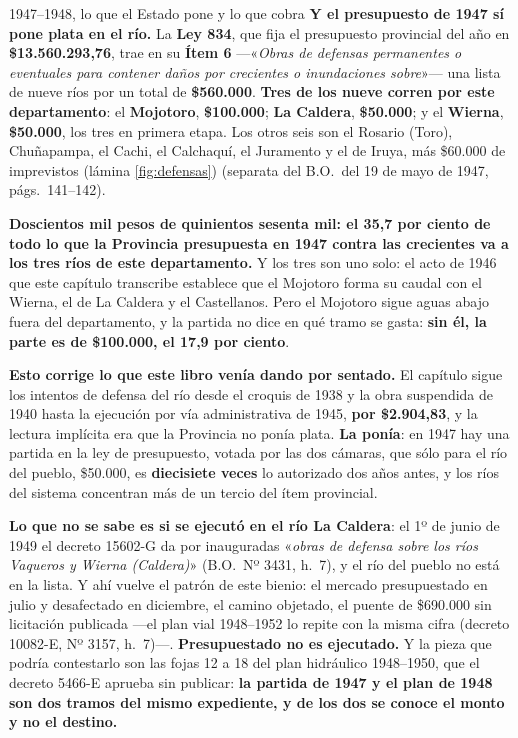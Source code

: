 \begin{ficha}{1947--1948, lo que el Estado pone y lo que cobra}
\textbf{Y el presupuesto de 1947 sí pone plata en el río.} La \textbf{Ley 834}, que fija el
presupuesto provincial del año en \textbf{\$13.560.293,76}, trae en su \textbf{Ítem 6}
---«\textit{Obras de defensas permanentes o eventuales para contener daños por crecientes o
inundaciones sobre}»--- una lista de nueve ríos por un total de \textbf{\$560.000}. \textbf{Tres
de los nueve corren por este departamento}: el \textbf{Mojotoro}, \textbf{\$100.000}; \textbf{La
Caldera}, \textbf{\$50.000}; y el \textbf{Wierna}, \textbf{\$50.000}, los tres en primera
etapa. Los otros seis son el Rosario (Toro), Chuñapampa, el Cachi, el Calchaquí, el Juramento y
el de Iruya, más \$60.000 de imprevistos (lámina \ref{fig:defensas}) (separata del B.O.\ del 19 de mayo de 1947,
págs.\ 141--142).

\begin{cautela}
\textbf{Doscientos mil pesos de quinientos sesenta mil: el 35,7 por ciento de todo lo que la
Provincia presupuesta en 1947 contra las crecientes va a los tres ríos de este departamento.}
Y los tres son uno solo: el acto de 1946 que este capítulo transcribe establece que el Mojotoro
forma su caudal con el Wierna, el de La Caldera y el Castellanos. Pero el Mojotoro sigue aguas abajo fuera del departamento, y la partida no dice en qué tramo se gasta: \textbf{sin él, la parte es de \$100.000, el 17,9 por ciento}.

\textbf{Esto corrige lo que este libro venía dando por sentado.} El capítulo sigue los intentos
de defensa del río desde el croquis de 1938 y la obra suspendida de 1940 hasta la ejecución por
vía administrativa de 1945, \textbf{por \$2.904,83}, y la lectura implícita era que la Provincia no
ponía plata. \textbf{La ponía}: en 1947 hay una partida en la ley de presupuesto, votada por las
dos cámaras, que sólo para el río del pueblo, \$50.000, es \textbf{diecisiete veces} lo autorizado dos años antes, y los ríos del sistema concentran más
de un tercio del ítem provincial.

\textbf{Lo que no se sabe es si se ejecutó en el río La Caldera}: el 1º de junio de 1949 el
decreto 15602-G da por inauguradas «\textit{obras de defensa sobre los ríos Vaqueros y Wierna
(Caldera)}» (B.O.\ Nº 3431, h.\ 7), y el río del pueblo no está en la lista. Y ahí vuelve el patrón de
este bienio: el mercado presupuestado en julio y desafectado en diciembre, el camino objetado, el
puente de \$690.000 sin licitación publicada ---el plan vial 1948--1952 lo repite con la misma cifra
(decreto 10082-E, Nº 3157, h.\ 7)---. \textbf{Presupuestado no es ejecutado.} Y la pieza que podría
contestarlo son las fojas 12 a 18 del plan hidráulico 1948--1950, que el decreto 5466-E aprueba
sin publicar: \textbf{la partida de 1947 y el plan de 1948 son dos tramos del mismo expediente,
y de los dos se conoce el monto y no el destino.}
\end{cautela}


\end{ficha}

